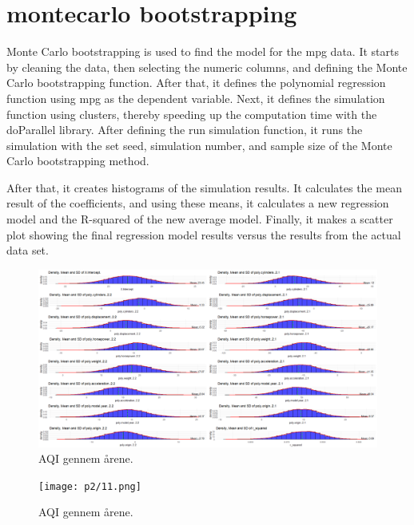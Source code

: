\section{montecarlo bootstrapping }

Monte Carlo bootstrapping is used to find the model for the mpg data. It starts by cleaning the data, then selecting the numeric columns, and defining the Monte Carlo bootstrapping function. After that, it defines the polynomial regression function using mpg as the dependent variable. Next, it defines the simulation function using clusters, thereby speeding up the computation time with the doParallel library. After defining the run simulation function, it runs the simulation with the set seed, simulation number, and sample size of the Monte Carlo bootstrapping method.

After that, it creates histograms of the simulation results. It calculates the mean result of the coefficients, and using these means, it calculates a new regression model and the R-squared of the new average model. Finally, it makes a scatter plot showing the final regression model results versus the results from the actual data set.


\begin{figure}[h] 
	\centering
	\includegraphics[width=14cm]{p2/10.png}
	\caption{AQI gennem årene.}
	\label{fig:j06}
\end{figure}
\begin{figure}[h] 
	\centering
	\texttt{[image: p2/11.png]}
	\caption{AQI gennem årene.}
	\label{fig:j06}
\end{figure}
